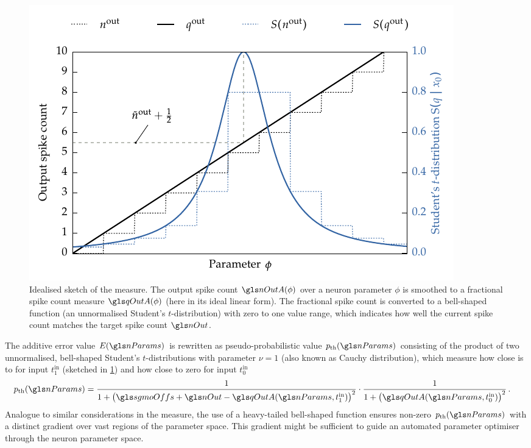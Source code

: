 \begin{figure}
	\includegraphics{media/chp4/student_t_step.pdf}
	\caption[{Idealised sketch of the SGMO measure}]{Idealised sketch of the \SGMO measure. The output spike count $\nOutA(\phi)$ over a neuron parameter $\phi$ is smoothed to a fractional spike count measure $\qOutA(\phi)$ (here in its ideal linear form). The fractional spike count is converted to a bell-shaped function (an unnormalised Student's $t$-distribution) with zero to one value range, which indicates how well the current spike count matches the target spike count $\nOut$.}
	\label{fig:student_t_step}
\end{figure}
The additive error value $E(\nParams)$ is rewritten as pseudo-probabilistic value $p_\mathrm{th}(\nParams)$ consisting of the product of two unnormalised, bell-shaped Student's $t$-distributions with parameter $\nu = 1$ (also known as Cauchy distribution), which measure how close \qOutA is to \nOutA for input $t^\mathrm{in}_1$ (sketched in \cref{fig:student_t_step}) and how close to zero for input $t^\mathrm{in}_0$
\begin{align}
	p_\mathrm{th}(\nParams) &= \frac{1}{1 + \big(\sgmoOffs + \nOut - \qOutA(\nParams, t^\mathrm{in}_1)\big)^2} \cdot \frac{1}{1 + \big(\qOutA(\nParams, t^\mathrm{in}_0)\big)^2} \,.
	\label{eqn:sgmo_pth}
\end{align}
Analogue to similar considerations in the \SGSO measure, the use of a heavy-tailed bell-shaped function ensures non-zero $p_\mathrm{th}(\nParams)$ with a distinct gradient over vast regions of the parameter space. This gradient might be sufficient to guide an automated parameter optimiser through the neuron parameter space.

